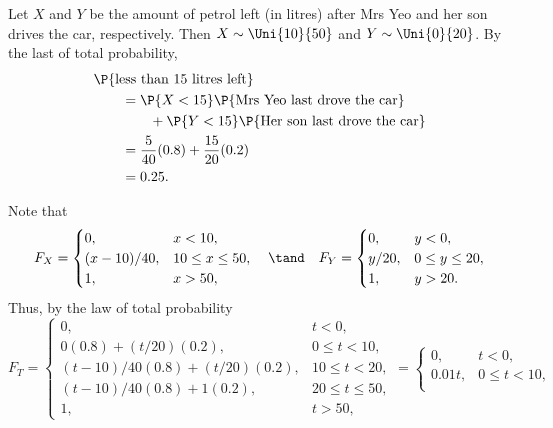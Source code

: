 \begin{solution}
    \begin{ppart}
        Let $X$ and $Y$ be the amount of petrol left (in litres) after Mrs Yeo and her son drives the car, respectively. Then $X \sim \Uni{10}{50}$ and $Y \sim \Uni{0}{20}$. By the last of total probability,
        \begin{align*}
            &\P{\text{less than 15 litres left}}\\
            &\hspace{2em}= \P{X < 15} \P{\text{Mrs Yeo last drove the car}}\\
            &\hspace{4em}+ \P{Y < 15} \P{\text{Her son last drove the car}}\\
            &\hspace{2em}= \frac{5}{40} (0.8) + \frac{15}{20} (0.2)\\
            &\hspace{2em}= 0.25.
        \end{align*}
    \end{ppart}
    \begin{ppart}
        Note that \[F_X = \begin{cases}
                0, & x < 10,\\
                (x-10)/40, & 10 \leq x \leq 50,\\
                1, & x > 50,
            \end{cases} \quad \tand \quad F_Y = \begin{cases}
                0, & y < 0,\\
                y/20, & 0 \leq y \leq 20,\\
                1, & y > 20.
            \end{cases}\]
        Thus, by the law of total probability \[F_T = \begin{cases}
            0 , & t < 0,\\
            0 (0.8) + (t/20) (0.2), & 0 \leq t < 10,\\
            (t-10)/40 (0.8) + (t/20) (0.2), & 10 \leq t < 20,\\
            (t-10)/40 (0.8) + 1 (0.2), & 20 \leq t \leq 50,\\
            1 , & t > 50,
        \end{cases} = \begin{cases}
            0 , & t < 0,\\
            0.01t, & 0 \leq t < 10,\\

\end{cases}\]
\end{ppart}
\end{solution}
